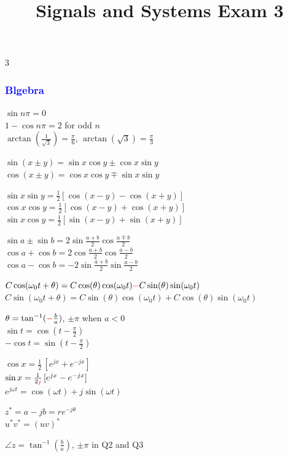\documentclass[4pt]{article}
\title{Signals and Systems Exam 3}
\theoremstyle{definition}
\theoremstyle{definition}
\renewcommand{\o}{\omega}
\newcommand{\red}[1]{\textcolor{red}{#1}}
\newcommand{\blue}[1]{\textcolor{blue}{#1}}
\begin{document}
\begin{landscape}
\raggedright
\begin{multicols}{3} %
\raggedcolumns
\subsubsection*{\blue{Blgebra}}
    $\sin n\pi = 0$\\
    $1-\cos n\pi = 2$ for odd $n$\\
    $\arctan(\frac{1}{\sqrt{3}}) = \frac{\pi}{6}$,  $\arctan(\sqrt{3}) = \frac{\pi} 3$

    $\sin(x\pm y) = \sin x \cos y \pm \cos x \sin y$\\
    $\cos(x\pm y) = \cos x \cos y \mp \sin x \sin y$

    $\sin x \sin y = \frac{1}{2}[\cos(x-y) - \cos(x+y)]$\\ %
    $\cos x \cos y = \frac{1}{2}[\cos(x-y) + \cos(x+y)]$\\
    $\sin x \cos y = \frac{1}{2}[\sin(x-y) + \sin(x+y)]$

    \(\sin a \pm \sin b = 2\sin \frac{a+b}{2} \cos \frac{a\mp b}{2}\)\\
    \(\cos a + \cos b = 2\cos \frac{a+b}{2} \cos \frac{a-b}{2}\)\\
    \(\cos a - \cos b = -2\sin \frac{a+b}{2} \sin \frac{a-b}{2}\)

    $C \cos(\o_0 t + \theta) = C\cos(\theta) \cos(\o_0 t) \red - C\sin(\theta)\sin(\o_0 t)$\\ 
    $C \sin(\o_0 t + \theta) = C\sin(\theta) \cos(\o_0 t) + C\cos(\theta)\sin(\o_0 t)$

    $\theta = \tan^{-1} (\red - \frac b a)$, $\pm \pi$ when $a<0$\\
    $\sin t = \cos (t - \frac{\pi}{2})$\\
    \(-\cos t = \sin(t - \frac{\pi}{2})\)

    $\cos x = \frac{1}{2}\,[e^{jx} + e^{-jx}]$\\
    $\sin x = \frac{1}{2 \red j}\, [e^{jx} - e^{-jx}]$\\
    $e^{j\o t} = \cos(\o t) + j\sin (\o t)$

    $z^* = a-jb = re^{-j\theta}$\\
    $u^* v^* = (uv)^*$

    $\angle z = \tan^{-1}(\frac b a)$, $\pm \pi$ in Q2 and Q3


\end{multicols}
\end{landscape}
\end{document}
